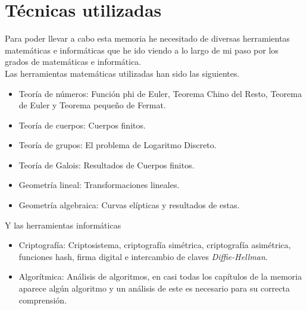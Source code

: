 \section{Técnicas utilizadas}
Para poder llevar a cabo esta memoria he necesitado de diversas herramientas matemáticas e informáticas que he ido viendo a lo largo de mi paso por los grados de matemáticas e informática.\\ 
Las herramientas matemáticas utilizadas han sido las siguientes.
\begin{itemize}
	\item Teoría de números: Función phi de Euler, Teorema Chino del Resto, Teorema de Euler y Teorema pequeño de Fermat.
	\item Teoría de cuerpos: Cuerpos finitos.
	\item Teoría de grupos: El problema de Logaritmo Discreto. 
	\item Teoría de Galois: Resultados de Cuerpos finitos.
	\item Geometría lineal: Transformaciones lineales.
	\item Geometría algebraica: Curvas elípticas y resultados de estas.
\end{itemize}

Y las herramientas informáticas
\begin{itemize}
	\item Criptografía: Criptosistema, criptografía simétrica, criptografía asimétrica, funciones hash, firma digital e intercambio de claves \emph{Diffie-Hellman}. 
	\item Algorítmica: Análisis de algoritmos, en casi todas los capítulos de la memoria aparece algún algoritmo y un análisis de este es necesario para su correcta comprensión.
\end{itemize}

		
